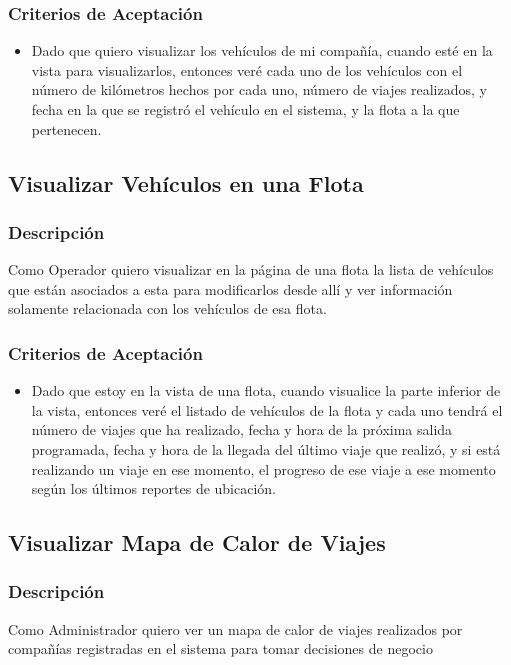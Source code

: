 \documentclass{article}
\begin{document}
\subsubsection{Criterios de Aceptación}
\begin{itemize}
    \item Dado que quiero visualizar los vehículos de mi compañía, cuando esté en la vista para visualizarlos, entonces veré cada uno de los vehículos con el número de kilómetros hechos por cada uno, número de viajes realizados, y fecha en la que se registró el vehículo en el sistema, y la flota a la que pertenecen.
\end{itemize}

\subsection{Visualizar Vehículos en una Flota}
\subsubsection{Descripción}
Como Operador quiero visualizar en la página de una flota la lista de vehículos que están asociados a esta para modificarlos desde allí y ver información solamente relacionada con los vehículos de esa flota.  
\subsubsection{Criterios de Aceptación}
\begin{itemize}
    \item Dado que estoy en la vista de una flota, cuando visualice la parte inferior de la vista, entonces veré el listado de vehículos de la flota y cada uno tendrá el número de viajes que ha realizado, fecha y hora de la próxima salida programada, fecha y hora de la llegada del último viaje que realizó, y si está realizando un viaje en ese momento, el progreso de ese viaje a ese momento según los últimos reportes de ubicación.
\end{itemize}

\subsection{Visualizar Mapa de Calor de Viajes}
\subsubsection{Descripción}
Como Administrador quiero ver un mapa de calor de viajes realizados por compañías registradas en el sistema para tomar decisiones de negocio
\end{document}
